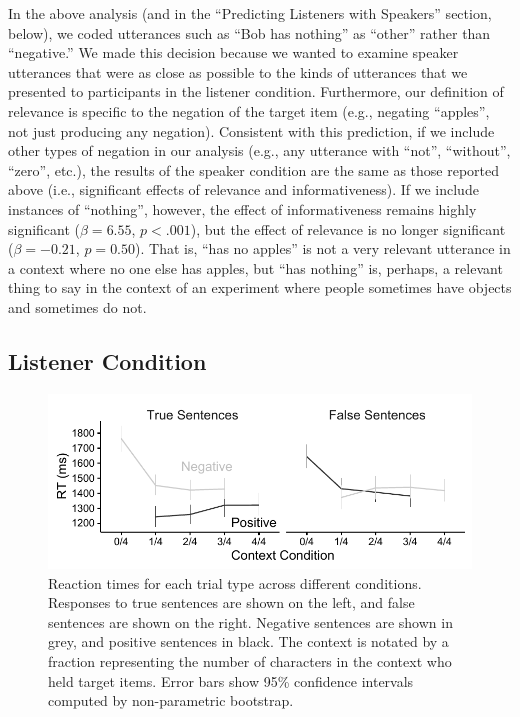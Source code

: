\documentclass[man, noapacite]{apa2}
\begin{document}
In the above analysis (and in the ``Predicting Listeners with Speakers'' section, below), we coded utterances such as ``Bob has nothing'' as ``other'' rather than ``negative.'' We made this decision because we wanted to examine speaker utterances that were as close as possible to the kinds of utterances that we presented to participants in the listener condition. Furthermore, our definition of relevance is specific to the negation of the target item (e.g., negating ``apples'', not just producing any negation). Consistent with this prediction, if we include other types of negation in our analysis (e.g., any utterance with ``not'', ``without'', ``zero'', etc.), the results of the speaker condition are the same as those reported above (i.e., significant effects of relevance and informativeness). If we include instances of ``nothing'', however, the effect of informativeness remains highly significant ($\beta= 6.55$, $p< .001$), but the effect of relevance is no longer significant ($\beta= -0.21$, $p = 0.50$). That is, ``has no apples'' is not a very relevant utterance in a context where no one else has apples, but ``has nothing'' is, perhaps, a relevant thing to say in the context of an experiment where people sometimes have objects and sometimes do not. 

\subsection{Listener Condition}

\begin{figure}[t]
\begin{center} 
\includegraphics[width=6in]{figures/rts_mod.pdf}
\caption{\label{fig:listenerrt} Reaction times for each trial type across different conditions. Responses to true sentences are shown on the left, and false sentences are shown on the right.  Negative sentences are shown in grey, and positive sentences in black.  The context is notated by a fraction representing the number of characters in the context who held target items. Error bars show 95\% confidence intervals computed by non-parametric bootstrap.}
\end{center} 
\end{figure}
\end{document}
